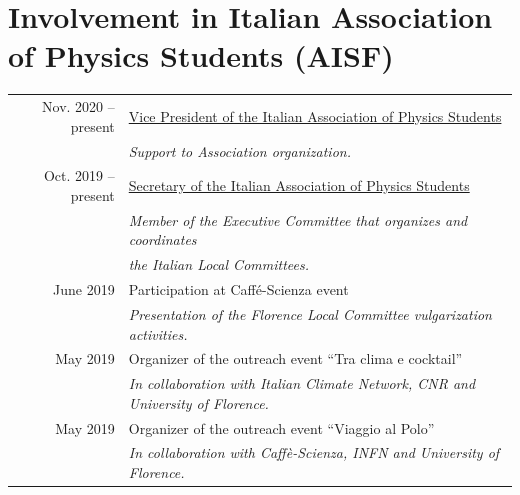 \documentclass[a4, 11pt]{report}
\begin{document}
    \vskip 12mm
    
    \section*{Involvement in Italian Association of Physics Students (AISF)}
        \begin{tabular*}{\textwidth}{r @{\extracolsep{\fill}} l}
            {\small Nov. 2020 -- present} & \ul{Vice President of the Italian Association of Physics Students}\\ 
            & {\small \emph {Support to Association organization.}}\\ [3mm]
            
            {\small Oct. 2019 -- present} & \ul{Secretary of the Italian Association of Physics Students}\\
            & {\small \emph {Member of the Executive Committee that organizes and coordinates}}\\
            & {\small \emph {the Italian Local Committees.}}\\ [3mm]
                                            
            {\small June 2019} & {Participation at Caffé-Scienza  event}\\
            & {\small \emph {Presentation of the Florence Local Committee vulgarization activities.}}\\ [3mm]
        
            {\small May 2019} & {Organizer of the outreach event ``Tra clima e cocktail''}\\
            & {\small \emph {In collaboration with Italian Climate Network, CNR and University of Florence.}}\\ [3mm]
        
            {\small May 2019} & {Organizer of the outreach event ``Viaggio al Polo''}\\
            & {\small \emph {In collaboration with Caffè-Scienza, INFN and University of Florence.}}\\ [3mm]
                                            
                                            
                                            

\end{tabular*}
\end{document}

